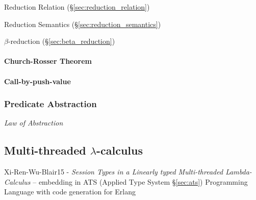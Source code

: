 Reduction Relation (\S\ref{sec:reduction_relation})

Reduction Semantics (\S\ref{sec:reduction_semantics})

$\beta$-reduction (\S\ref{sec:beta_reduction})



\paragraph{Church-Rosser Theorem}\label{sec:church_rosser}\hfill

\paragraph{Call-by-push-value}\label{sec:call_by_pushvalue}\hfill



\subsubsection{Predicate Abstraction}\label{sec:predicate_abstraction}

\emph{Law of Abstraction}



\subsection{Multi-threaded $\lambda$-calculus}\label{sec:mtlc}

\begingroup

\newcommand{\chpos}{\mathbf{chpos}}
\newcommand{\chneg}{\mathbf{chneg}}
\newcommand{\channelsend}{\mono{channel\_send}}
\newcommand{\chanpossend}{\mono{chanpos\_send}}
\newcommand{\channegsend}{\mono{channeg\_send}}
\newcommand{\channelrecv}{\mono{channel\_recv}}
\newcommand{\chanposrecv}{\mono{chanpos\_recv}}
\newcommand{\channegrecv}{\mono{channeg\_recv}}
\newcommand{\channelclose}{\mono{channel\_close}}
\newcommand{\chanposclose}{\mono{chanpos\_close}}
\newcommand{\channegclose}{\mono{channeg\_close}}
\newcommand{\Send}{\mathsf{Send}}
\newcommand{\Recv}{\mathsf{Recv}}
\renewcommand{\Unit}{\mathsf{\mathbf{1}}}

Xi-Ren-Wu-Blair15 - \emph{Session Types in a Linearly typed
  Multi-threaded Lambda-Calculus} -- embedding in ATS (Applied Type
System \S\ref{sec:ats}) Programming Language with code generation for
Erlang

